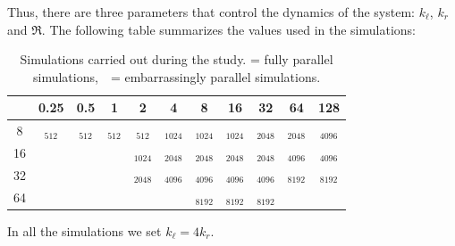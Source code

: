 \documentclass{beamer} %
\begin{document}
\begin{frame}
	Thus, there are three parameters that control the dynamics of the system: $k_\ell$, $k_r$ and $\Re$. The following table summarizes the values used in the simulations:

	\begin{table}[ht]
		\centering
		\def\tickgreen{\textcolor{color_green3}{\ding{51}}}
		\def\tickblue{\textcolor{color_blue3}{\ding{51}}}
		\setlength{\tabcolsep}{3pt}
		\renewcommand{\arraystretch}{1.5}
		{\fontsize{8pt}{10pt}
			\begin{tabular}{c|cccccccccc}
				\diagbox[width=\dimexpr \textwidth/16+2\tabcolsep\relax, height=1cm]{$k_r$}{$\Re$} & 0.25               & 0.5                & 1                  & 2                           & 4                            & 8                            & 16                           & 32                           & 64                  & 128                 \\\hline
				8                                                                                  & \tickgreen$_{512}$ & \tickgreen$_{512}$ & \tickgreen$_{512}$ & \tickgreen\tickblue$_{512}$ & \tickgreen\tickblue$_{1024}$ & \tickgreen\tickblue$_{1024}$ & \tickgreen\tickblue$_{1024}$ & \tickgreen\tickblue$_{2048}$ & \tickgreen$_{2048}$ & \tickgreen$_{4096}$ \\
				16                                                                                 &                    &                    &                    & \tickblue$_{1024}$          & \tickblue$_{2048}$           & \tickgreen\tickblue$_{2048}$ & \tickgreen\tickblue$_{2048}$ & \tickgreen\tickblue$_{2048}$ & \tickgreen$_{4096}$ & \tickgreen$_{4096}$ \\
				32                                                                                 &                    &                    &                    & \tickblue$_{2048}$          & \tickblue$_{4096}$           & \tickgreen\tickblue$_{4096}$ & \tickgreen\tickblue$_{4096}$ & \tickgreen\tickblue$_{4096}$ & \tickgreen$_{8192}$ & \tickgreen$_{8192}$ \\
				64                                                                                 &                    &                    &                    &                             &                              & \tickgreen$_{8192}$          & \tickgreen$_{8192}$          & \tickgreen$_{8192}$          &                     &                     \\
			\end{tabular}}
		\caption{Simulations carried out during the study. \tickgreen = fully parallel simulations,\ \  \tickblue = embarrassingly parallel simulations.}\label{tab:simulations}
	\end{table}

	In all the simulations we set $k_\ell = 4 k_r$.
\end{frame}
\end{document}
